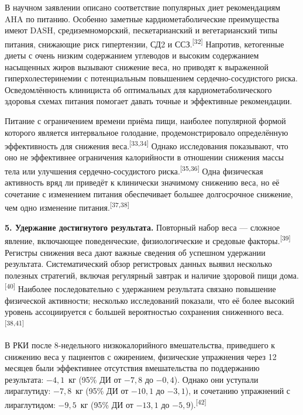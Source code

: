\documentclass[11pt,a4paper]{article}
\newcommand{\src}[1]{\textsuperscript{[#1]}}
\begin{document}
В научном заявлении описано соответствие популярных диет рекомендациям AHA по питанию. Особенно заметные кардиометаболические преимущества имеют DASH, средиземноморский, пескетарианский и вегетарианский типы питания, снижающие риск гипертензии, СД2 и ССЗ.\src{32} Напротив, кетогенные диеты с очень низким содержанием углеводов и высоким содержанием насыщенных жиров вызывают снижение веса, но приводят к выраженной гиперхолестеринемии с потенциальным повышением сердечно-сосудистого риска. Осведомлённость клинициста об оптимальных для кардиометаболического здоровья схемах питания помогает давать точные и эффективные рекомендации.

Питание с ограничением времени приёма пищи, наиболее популярной формой которого является интервальное голодание, продемонстрировало определённую эффективность для снижения веса.\src{33,34} Однако исследования показывают, что оно не эффективнее ограничения калорийности в отношении снижения массы тела или улучшения сердечно-сосудистого риска.\src{35,36} Одна физическая активность вряд ли приведёт к клинически значимому снижению веса, но её сочетание с изменением питания обеспечивает большее долгосрочное снижение, чем одно изменение питания.\src{37,38}

\textbf{5. Удержание достигнутого результата.} Повторный набор веса --- сложное явление, включающее поведенческие, физиологические и средовые факторы.\src{39} Регистры снижения веса дают важные сведения об успешном удержании результата. Систематический обзор регистровых данных выявил несколько полезных стратегий, включая регулярный завтрак и наличие здоровой пищи дома.\src{40} Наиболее последовательно с удержанием результата связано повышение физической активности; несколько исследований показали, что её более высокий уровень ассоциируется с большей вероятностью сохранения сниженного веса.\src{38,41}

В РКИ после 8-недельного низкокалорийного вмешательства, приведшего к снижению веса у пациентов с ожирением, физические упражнения через 12 месяцев были эффективнее отсутствия вмешательства по поддержанию результата: $-4{,}1$~кг (95\% ДИ от $-7{,}8$ до $-0{,}4$). Однако они уступали лираглутиду: $-7{,}8$~кг (95\% ДИ от $-10{,}1$ до $-3{,}1$), и сочетанию упражнений с лираглутидом: $-9{,}5$~кг (95\% ДИ от $-13{,}1$ до $-5{,}9$).\src{42}
\end{document}
